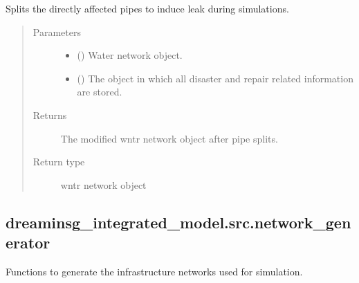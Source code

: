 \documentclass[letterpaper,10pt,english]{sphinxmanual}
\begin{document}
\begin{fulllineitems}
\label{\detokenize{apidoc:dreaminsg_integrated_model.src.network_recovery.pipe_leak_node_generator}}
\sphinxAtStartPar
Splits the directly affected pipes to induce leak during simulations.
\begin{quote}\begin{description}
\item[{Parameters}] \leavevmode\begin{itemize}
\item {} 
\sphinxAtStartPar
{} () \textendash{} Water network object.

\item {} 
\sphinxAtStartPar
{} () \textendash{} The object in which all disaster and repair related information are stored.

\end{itemize}

\item[{Returns}] \leavevmode
\sphinxAtStartPar
The modified wntr network object after pipe splits.

\item[{Return type}] \leavevmode
\sphinxAtStartPar
wntr network object

\end{description}\end{quote}

\end{fulllineitems}



\subsection{dreaminsg\_integrated\_model.src.network\_generator}
\label{\detokenize{apidoc:dreaminsg-integrated-model-src-network-generator}}\label{\detokenize{apidoc:module-dreaminsg_integrated_model.src.network_generator}}
\sphinxAtStartPar
Functions to generate the infrastructure networks used for simulation.
\end{document}
